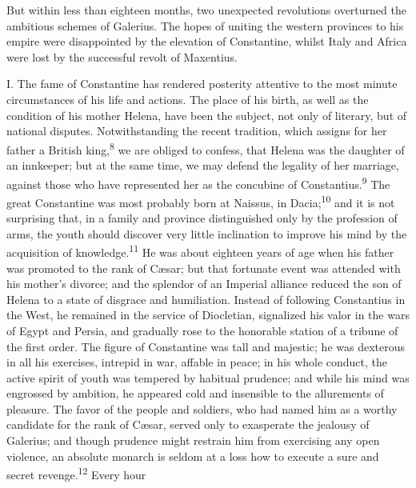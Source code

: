 

But within less than eighteen months, two unexpected revolutions
overturned the ambitious schemes of Galerius. The hopes of
uniting the western provinces to his empire were disappointed by
the elevation of Constantine, whilst Italy and Africa were lost
by the successful revolt of Maxentius.

I. The fame of Constantine has rendered posterity attentive to
the most minute circumstances of his life and actions. The place
of his birth, as well as the condition of his mother Helena, have
been the subject, not only of literary, but of national disputes.
Notwithstanding the recent tradition, which assigns for her
father a British king,\textsuperscript{8} we are obliged to confess, that Helena
was the daughter of an innkeeper; but at the same time, we may
defend the legality of her marriage, against those who have
represented her as the concubine of Constantius.\textsuperscript{9} The great
Constantine was most probably born at Naissus, in Dacia;\textsuperscript{10} and
it is not surprising that, in a family and province distinguished
only by the profession of arms, the youth should discover very
little inclination to improve his mind by the acquisition of
knowledge.\textsuperscript{11} He was about eighteen years of age when his father
was promoted to the rank of Cæsar; but that fortunate event was
attended with his mother’s divorce; and the splendor of an
Imperial alliance reduced the son of Helena to a state of
disgrace and humiliation. Instead of following Constantius in the
West, he remained in the service of Diocletian, signalized his
valor in the wars of Egypt and Persia, and gradually rose to the
honorable station of a tribune of the first order. The figure of
Constantine was tall and majestic; he was dexterous in all his
exercises, intrepid in war, affable in peace; in his whole
conduct, the active spirit of youth was tempered by habitual
prudence; and while his mind was engrossed by ambition, he
appeared cold and insensible to the allurements of pleasure. The
favor of the people and soldiers, who had named him as a worthy
candidate for the rank of Cæsar, served only to exasperate the
jealousy of Galerius; and though prudence might restrain him from
exercising any open violence, an absolute monarch is seldom at a
loss how to execute a sure and secret revenge.\textsuperscript{12} Every hour
